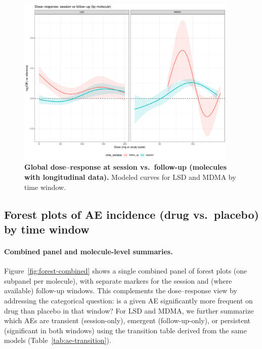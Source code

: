 \begin{figure}[htb]
  \centering
  \includegraphics[width=0.94\textwidth]{figures/dr_session_vs_followup.pdf}
  \caption{\textbf{Global dose–response at session vs.\ follow-up (molecules with longitudinal data).}
  Modeled curves for LSD and MDMA by time window.}
  \label{fig:dr-session-followup}
\end{figure}


\subsection{Forest plots of AE incidence (drug vs.\ placebo) by time window}

\paragraph{Combined panel and molecule-level summaries.}
Figure~\ref{fig:forest-combined} shows a single combined panel of forest plots (one subpanel per molecule), with separate markers for the session and (where available) follow-up windows. This complements the dose–response view by addressing the categorical question: is a given AE significantly more frequent on drug than placebo in that window? For LSD and MDMA, we further summarize which AEs are transient (session-only), emergent (follow-up-only), or persistent (significant in both windows) using the transition table derived from the same models (Table~\ref{tab:ae-transition}).

